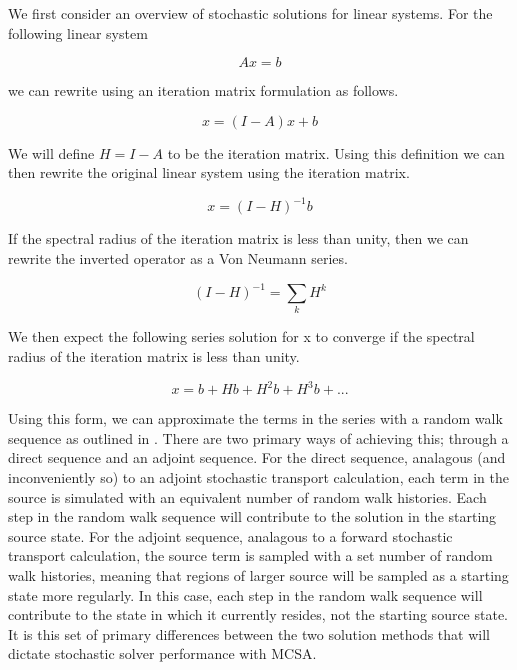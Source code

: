 \documentclass[note]{TechNote}
\begin{document}
We first consider an overview of stochastic solutions for linear
systems. For the following linear system

\begin{equation}
  A x = b
  \label{eq:linear_system}
\end{equation}

we can rewrite using an iteration matrix formulation as follows.

\begin{equation}
  x = (I-A) x + b
  \label{eq:iteration_form}
\end{equation}

We will define $H=I-A$ to be the iteration matrix. Using this
definition we can then rewrite the original linear system using the
iteration matrix.

\begin{equation}
  x = (I-H)^{-1} b
  \label{eq:iteration_form2}
\end{equation}

If the spectral radius of the iteration matrix is less than unity,
then we can rewrite the inverted operator as a Von Neumann series.

\begin{equation}
  (I-H)^{-1} = \sum_k H^k
  \label{eq:von_neumann_series}
\end{equation}

We then expect the following series solution for x to converge if the
spectral radius of the iteration matrix is less than unity.

\begin{equation}
  x = b + H b + H^2 b + H^3 b + ...
  \label{eq:series_solution}
\end{equation}

Using this form, we can approximate the terms in the series with a
random walk sequence as outlined in \cite{hammersley_1964}. There are
two primary ways of achieving this; through a direct sequence and an
adjoint sequence. For the direct sequence, analagous (and
inconveniently so) to an adjoint stochastic transport calculation,
each term in the source is simulated with an equivalent number of
random walk histories. Each step in the random walk sequence will
contribute to the solution in the starting source state. For the
adjoint sequence, analagous to a forward stochastic transport
calculation, the source term is sampled with a set number of random
walk histories, meaning that regions of larger source will be sampled
as a starting state more regularly. In this case, each step in the
random walk sequence will contribute to the state in which it
currently resides, not the starting source state. It is this set of
primary differences between the two solution methods that will dictate
stochastic solver performance with MCSA.
\end{document}
